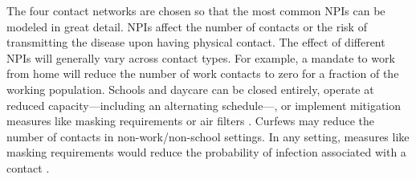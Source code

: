The four contact networks are chosen so that the most common NPIs can be modeled in
great detail. NPIs affect the number of contacts or the risk of transmitting the disease
upon having physical contact. The effect of different NPIs will generally vary across
contact types. For example, a mandate to work from home will reduce the number of work
contacts to zero for a fraction of the working population. Schools and daycare can be
closed entirely, operate at reduced capacity---including an alternating schedule---, or
implement mitigation measures like masking requirements or air filters
\citep{Lessler2021}. Curfews may reduce the number of contacts in non-work/non-school
settings. In any setting, measures like masking requirements would reduce the
probability of infection associated with a contact \citep{Cheng2021}.

